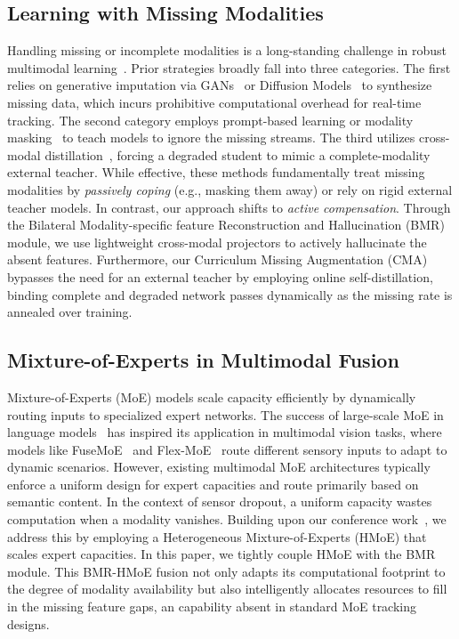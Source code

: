 \subsection{Learning with Missing Modalities}
Handling missing or incomplete modalities is a long-standing challenge in robust multimodal learning~\cite{missing_survey, missing_1}. Prior strategies broadly fall into three categories. The first relies on generative imputation via GANs~\cite{gans} or Diffusion Models~\cite{croitoru2023diffusion} to synthesize missing data, which incurs prohibitive computational overhead for real-time tracking. The second category employs prompt-based learning or modality masking~\cite{missing_reconstraction} to teach models to ignore the missing streams. The third utilizes cross-modal distillation~\cite{missing_disstilation}, forcing a degraded student to mimic a complete-modality external teacher. While effective, these methods fundamentally treat missing modalities by \emph{passively coping} (e.g., masking them away) or rely on rigid external teacher models. In contrast, our approach shifts to \emph{active compensation}. Through the Bilateral Modality-specific feature Reconstruction and Hallucination (BMR) module, we use lightweight cross-modal projectors to actively hallucinate the absent features. Furthermore, our Curriculum Missing Augmentation (CMA) bypasses the need for an external teacher by employing online self-distillation, binding complete and degraded network passes dynamically as the missing rate is annealed over training.

\subsection{Mixture-of-Experts in Multimodal Fusion}
Mixture-of-Experts (MoE) models scale capacity efficiently by dynamically routing inputs to specialized expert networks. The success of large-scale MoE in language models~\cite{dai2024deepseekmoe, llama-moe} has inspired its application in multimodal vision tasks, where models like FuseMoE~\cite{han2025fusemoe} and Flex-MoE~\cite{yunflex-moe} route different sensory inputs to adapt to dynamic scenarios. However, existing multimodal MoE architectures typically enforce a uniform design for expert capacities and route primarily based on semantic content. In the context of sensor dropout, a uniform capacity wastes computation when a modality vanishes. Building upon our conference work~\cite{tan2025flextrack}, we address this by employing a Heterogeneous Mixture-of-Experts (HMoE) that scales expert capacities. In this paper, we tightly couple HMoE with the BMR module. This BMR-HMoE fusion not only adapts its computational footprint to the degree of modality availability but also intelligently allocates resources to fill in the missing feature gaps, an capability absent in standard MoE tracking designs.
